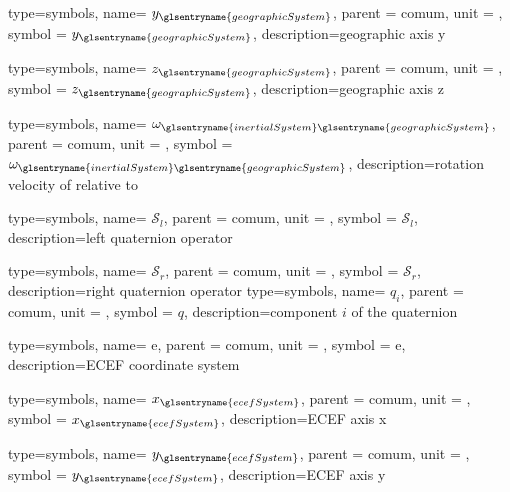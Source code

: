{type=symbols,
  name= \ensuremath{y_{\glsentryname{geographicSystem}}},
  parent = {comum},
  unit = \unexpanded{},
  symbol = \ensuremath{y_{\glsentryname{geographicSystem}}},
  description={geographic axis y}
}

{type=symbols,
  name= \ensuremath{z_{\glsentryname{geographicSystem}}},
  parent = {comum},
  unit = \unexpanded{},
  symbol = \ensuremath{z_{\glsentryname{geographicSystem}}},
  description={geographic axis z}
}

{type=symbols,
  name= \ensuremath{\omega_{\glsentryname{inertialSystem}\glsentryname{geographicSystem}}},
  parent = {comum},
  unit = \unexpanded{\si{\radian\per\second}},
  symbol = \ensuremath{\omega_{\glsentryname{inertialSystem}\glsentryname{geographicSystem}}},
  description={rotation velocity of  relative to 
    }
}



{type=symbols,
  name= \ensuremath{\boldsymbol{\mathcal{S}}_{l}},
  parent = {comum},
  unit = \unexpanded{},
  symbol = \ensuremath{\boldsymbol{\mathcal{S}}_{l}},
  description={left quaternion operator}
}

{type=symbols,
  name= \ensuremath{\boldsymbol{\mathcal{S}}_{r}},
  parent = {comum},
  unit = \unexpanded{},
  symbol = \ensuremath{\boldsymbol{\mathcal{S}}_{r}},
  description={right quaternion operator}
}
{type=symbols,
  name= \ensuremath{q_i},
  parent = {comum},
  unit = {},
  symbol = \ensuremath{q},
  description={component \ensuremath{i} of the quaternion }
}


{type=symbols,
  name= \ensuremath{\mathrm{e}},
  parent = {comum},
  unit = \unexpanded{},
  symbol = \ensuremath{\mathrm{e}},
  description={ECEF coordinate system}
}

{type=symbols,
  name= \ensuremath{x_{\glsentryname{ecefSystem}}},
  parent = {comum},
  unit = \unexpanded{},
  symbol = \ensuremath{x_{\glsentryname{ecefSystem}}},
  description={ECEF axis x}
}

{type=symbols,
  name= \ensuremath{y_{\glsentryname{ecefSystem}}},
  parent = {comum},
  unit = \unexpanded{},
  symbol = \ensuremath{y_{\glsentryname{ecefSystem}}},
  description={ECEF axis y}
}

